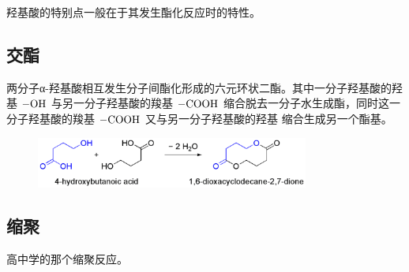 羟基酸的特别点一般在于其发生酯化反应时的特性。

\subsection{交酯}

两分子α-羟基酸相互发生分子间酯化形成的六元环状二酯。其中一分子羟基酸的羟基 $\ce{-OH}$ 与另一分子羟基酸的羧基 $\ce{-COOH}$ 缩合脱去一分子水生成酯，同时这一分子羟基酸的羧基 $\ce{-COOH}$ 又与另一分子羟基酸的羟基  缩合生成另一个酯基。

\begin{figure}[h]
    \centering
    \includegraphics[width=0.8\textwidth]{img/1000px-hydroxybutanoic.png}
\end{figure}

\subsection{缩聚}

高中学的那个缩聚反应。